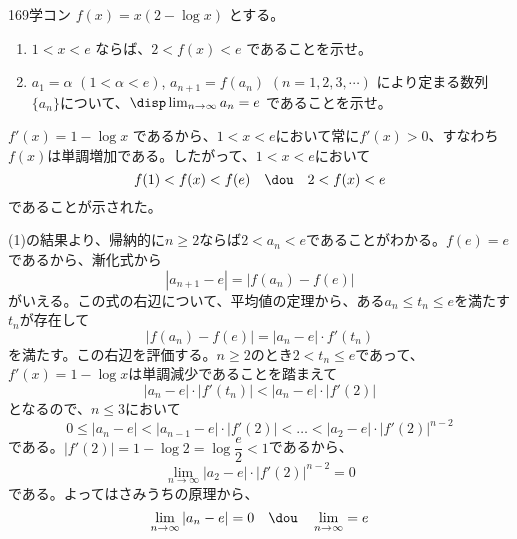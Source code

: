 \begin{thm}{169}{}{学コン}
 $f(x)=x(2-\log x)$ とする。
 \begin{enumerate}
  \item $1<x<e$ ならば、$2<f(x)<e$ であることを示せ。
  \item $a_1=\alpha$ $(1<\alpha <e)$, $a_{n+1}=f(a_n)$ $(n=1, 2, 3, \cdots)$ により定まる数列$\{a_n\}$について、$\disp \lim_{n\to\infty} a_n = e$ であることを示せ。
 \end{enumerate}
\end{thm}

$f'(x)=1-\log x$ であるから、$1<x<e$において常に$f'(x)>0$、すなわち$f(x)$は単調増加である。したがって、$1<x<e$において
\[ f(1)<f(x)<f(e) \quad\dou\quad 2<f(x)<e \]
であることが示された。

(1)の結果より、帰納的に$n\ge 2$ならば$2<a_n<e$であることがわかる。$f(e)=e$であるから、漸化式から
\[ |a_{n+1}-e|=|f(a_n)-f(e)| \]
がいえる。この式の右辺について、平均値の定理から、ある$a_n\le t_n \le e$を満たす$t_n$が存在して
\[ |f(a_n)-f(e)|=|a_n-e|\cdot f'(t_n) \]
を満たす。この右辺を評価する。$n\ge 2$のとき$2<t_n\le e$であって、$f'(x)=1-\log x$は単調減少であることを踏まえて
\[ |a_n-e|\cdot |f'(t_n)| < |a_n-e|\cdot |f'(2)| \]
となるので、$n\le 3$において
\[ 0\le |a_n-e|<|a_{n-1}-e|\cdot |f'(2)|<\dots< |a_2-e|\cdot |f'(2)|^{n-2} \]
である。$|f'(2)|=1-\log 2=\log \dfrac{e}{2}<1$であるから、
\[ \lim_{n\to\infty} |a_2-e|\cdot |f'(2)|^{n-2}=0 \]
である。よってはさみうちの原理から、
\[ \lim_{n\to\infty} |a_n-e|=0 \quad\dou\quad \lim_{n\to\infty} =e \]